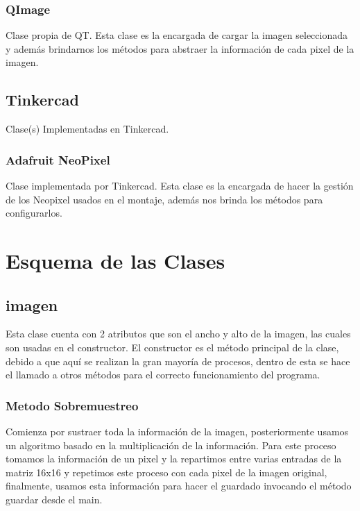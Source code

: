 \documentclass{article}
\begin{document}
    \begin{flushleft}
    \subsubsection{QImage}
    Clase propia de QT. Esta clase es la encargada de cargar la imagen seleccionada y además brindarnos los métodos para abstraer la información de cada pixel de la imagen.
    \end{flushleft}
    
    \begin{flushleft}
    \subsection{Tinkercad}
    Clase(s) Implementadas en Tinkercad.
    \end{flushleft}
    
     \begin{flushleft}
    \subsubsection{Adafruit NeoPixel}
    Clase implementada por Tinkercad. Esta clase es la encargada de hacer la gestión de los Neopixel usados en el montaje, además nos brinda los métodos para configurarlos.
    \end{flushleft}
    
\section{Esquema de las Clases}
\label{esquema}
    \begin{flushleft}
    \subsection{imagen}
    Esta clase cuenta con 2 atributos que son el ancho y alto de la imagen, las cuales son usadas en el constructor. El constructor es el método principal de la clase, debido a que aquí se realizan la gran mayoría de procesos, dentro de esta se hace el llamado a otros métodos para el correcto funcionamiento del programa.
    \end{flushleft}
    
    \begin{flushleft}
    \subsubsection{Metodo Sobremuestreo}
    Comienza por sustraer toda la información de la imagen, posteriormente usamos un algoritmo basado en la multiplicación de la información. Para este proceso tomamos la información de un pixel y la repartimos entre varias entradas de la matriz 16x16 y repetimos este proceso con cada pixel de la imagen original, finalmente, usamos esta información para hacer el guardado invocando el método guardar desde el main.
    \end{flushleft}
    
\end{document}
